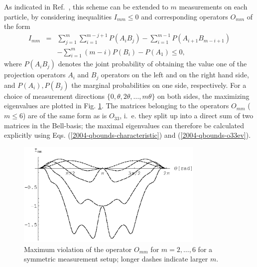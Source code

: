 \documentclass[prl,showpacs,showkeys,amsfonts,amsmath,twocolumn]{revtex4}
\begin{document}
As indicated in Ref.~\cite{collins-gisin-2003}, this scheme can be extended to $m$
measurements on each particle, by considering inequalities $I_{mm}
\leq 0$ and
corresponding operators $O_{mm}$ of the form
\begin{eqnarray}
  I_{mm}&=& \sum_{j=1}^{m}\sum_{i=1}^{m-j+1}P({A_i B_j})-\sum_{i=1}^{m-1}
  P({A_{i+1}B_{m-i+1}}) \nonumber\\
  &&-\sum_{i=1}^{m}(m-i)P(B_{i}) - P(A_1) \leq 0,
\end{eqnarray}
where $P(A_i B_j)$ denotes the joint probability of obtaining the value one of the
projection operators $A_i$ and $B_j$ operators on the left and on the
right hand side, and $P(A_i), P(B_j)$ the marginal probabilities on
one side, respectively.
For a choice of measurement directions
$\{0,\theta,2\theta,\ldots,m\theta\}$ on both sides,
the maximizing eigenvalues
are plotted in Fig. \ref{fig:2004-qbounds-f2}.
The matrices belonging to the operators $O_{mm}$ ($m \leq
6$)
are of the same form
as is $O_{33}$, i.~e. they
split up into a direct sum of two matrices in the
Bell-basis; the maximal eigenvalues can therefore be  calculated
explicitly using Eqs. (\ref{2004-qbounds-characteristic}) and (\ref{2004-qbounds-o33ev}).
\begin{figure}[htbp]
  \centering
  \includegraphics[width=90mm]{2004-qbounds-f2}
  \caption{Maximum violation of the operator $O_{mm}$ for
    $m=2,\ldots,6$ for a symmetric measurement setup; longer dashes indicate larger $m$.}
  \label{fig:2004-qbounds-f2}
\end{figure}





\end{document}
